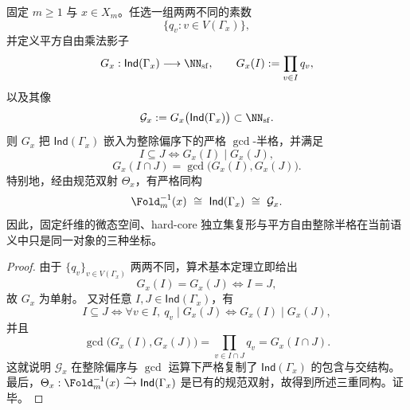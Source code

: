 \begin{theorem}\label{thm:conclusion-fold-fiber-faceposet-squarefree-divisibility-shadow}
固定 \(m\ge 1\) 与 \(x\in X_m\)。任选一组两两不同的素数
\[
\{q_v:v\in V(\Gamma_x)\},
\]
并定义平方自由乘法影子
\[
G_x:\mathsf{Ind}(\Gamma_x)\longrightarrow \NN_{\mathrm{sf}},
\qquad
G_x(I):=\prod_{v\in I}q_v,
\]
以及其像
\[
\mathcal G_x:=G_x\bigl(\mathsf{Ind}(\Gamma_x)\bigr)\subset \NN_{\mathrm{sf}}.
\]
则 \(G_x\) 把 \(\mathsf{Ind}(\Gamma_x)\) 嵌入为整除偏序下的严格 \(\gcd\)-半格，并满足
\[
I\subseteq J
\iff
G_x(I)\mid G_x(J),
\]
\[
G_x(I\cap J)=\gcd\bigl(G_x(I),G_x(J)\bigr).
\]
特别地，经由规范双射 \(\Theta_x\)，有严格同构
\[
\Fold_m^{-1}(x)\ \cong\ \mathsf{Ind}(\Gamma_x)\ \cong\ \mathcal G_x.
\]
因此，固定纤维的微态空间、hard-core 独立集复形与平方自由整除半格在当前语义中只是同一对象的三种坐标。
\end{theorem}
\begin{proof}
由于 \(\{q_v\}_{v\in V(\Gamma_x)}\) 两两不同，算术基本定理立即给出
\[
G_x(I)=G_x(J)\iff I=J,
\]
故 \(G_x\) 为单射。
又对任意 \(I,J\in\mathsf{Ind}(\Gamma_x)\)，有
\[
I\subseteq J
\iff
\forall v\in I,\ q_v\mid G_x(J)
\iff
G_x(I)\mid G_x(J),
\]
并且
\[
\gcd\bigl(G_x(I),G_x(J)\bigr)
=
\prod_{v\in I\cap J}q_v
=
G_x(I\cap J).
\]
这就说明 \(\mathcal G_x\) 在整除偏序与 \(\gcd\) 运算下严格复制了 \(\mathsf{Ind}(\Gamma_x)\) 的包含与交结构。
最后，\(\Theta_x:\Fold_m^{-1}(x)\xrightarrow{\sim}\mathsf{Ind}(\Gamma_x)\) 是已有的规范双射，故得到所述三重同构。证毕。
\end{proof}

